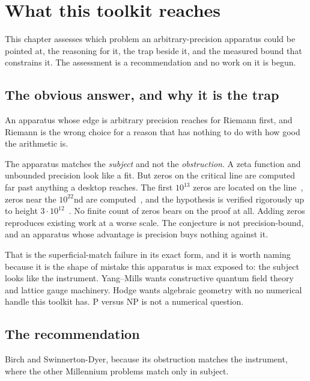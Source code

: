 \chapter{What this toolkit reaches}

This chapter assesses which problem an arbitrary-precision apparatus could be pointed at, the
reasoning for it, the trap beside it, and the measured bound that constrains it. The assessment is a
recommendation and no work on it is begun.

\section{The obvious answer, and why it is the trap}

An apparatus whose edge is arbitrary precision reaches for Riemann first, and Riemann is the wrong
choice for a reason that has nothing to do with how good the arithmetic is.

The apparatus matches the \emph{subject} and not the \emph{obstruction}. A zeta function and
unbounded precision look like a fit. But zeros on the critical line are computed far past anything a
desktop reaches. The first $10^{13}$ zeros are located on the line~\cite{src:Gourdon-2004}, zeros
near the $10^{22}$nd are computed~\cite{src:Odlyzko-2001}, and the hypothesis is verified rigorously
up to height $3\cdot10^{12}$~\cite{src:Platt-and-Trudgian-2021}. No finite count of zeros bears on
the proof at all. Adding zeros reproduces existing work at a worse scale. The conjecture is not
precision-bound, and an apparatus whose advantage is precision buys nothing against it.

That is the superficial-match failure in its exact form, and it is worth naming because it is the
shape of mistake this apparatus is max exposed to: the subject looks like the instrument.
Yang--Mills wants constructive quantum field theory and lattice gauge machinery. Hodge wants
algebraic geometry with no numerical handle this toolkit has. P versus NP is not a numerical
question.

\section{The recommendation}

Birch and Swinnerton-Dyer, because its obstruction matches the instrument, where the other
Millennium problems match only in subject.

